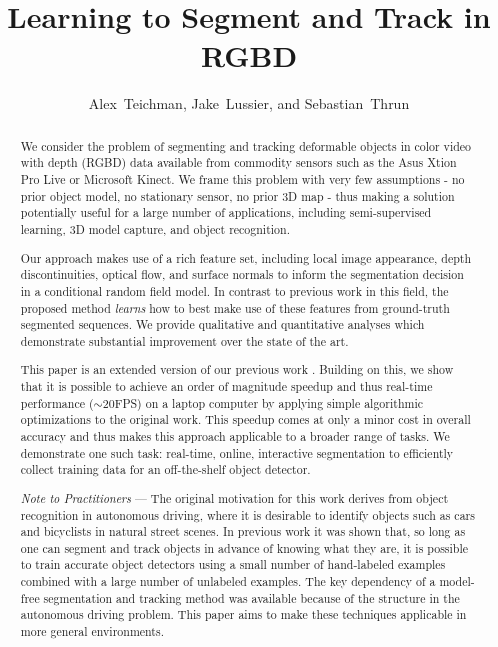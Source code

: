 \documentclass[journal]{IEEEtran}
\begin{document}
\title{Learning to Segment and Track in RGBD}
\author{Alex~Teichman, Jake~Lussier, and Sebastian~Thrun}

\maketitle



\begin{abstract}
We consider the problem of segmenting and tracking deformable objects in color video with depth (RGBD) data available from commodity sensors such as the Asus Xtion Pro Live or Microsoft Kinect.  We frame this problem with very few assumptions - no prior object model, no stationary sensor, no prior 3D map - thus making a solution potentially useful for a large number of applications, including semi-supervised learning, 3D model capture, and object recognition.

Our approach makes use of a rich feature set, including local image appearance, depth discontinuities, optical flow, and surface normals to inform the segmentation decision in a conditional random field model.  In contrast to previous work in this field, the proposed method \emph{learns} how to best make use of these features from ground-truth segmented sequences.  We provide qualitative and quantitative analyses which demonstrate substantial improvement over the state of the art.

This paper is an extended version of our previous work \cite{teichman2012a}.  Building on this, we show that it is possible to achieve an order of magnitude speedup and thus real-time performance ($\sim$20FPS) on a laptop computer by applying simple algorithmic optimizations to the original work.  This speedup comes at only a minor cost in overall accuracy and thus makes this approach applicable to a broader range of tasks. We demonstrate one such task: real-time, online, interactive segmentation to efficiently collect training data for an off-the-shelf object detector.

\vspace{0.1in}
\textit{Note to Practitioners} --- The original motivation for this work derives from object recognition in autonomous driving, where it is desirable to identify objects such as cars and bicyclists in natural street scenes.  In previous work \cite{teichman2011b} it was shown that, so long as one can segment and track objects in advance of knowing what they are, it is possible to train accurate object detectors using a small number of hand-labeled examples combined with a large number of unlabeled examples.  The key dependency of a model-free segmentation and tracking method was available because of the structure in the autonomous driving problem. This paper aims to make these techniques applicable in more general environments.


\end{abstract}
\end{document}
